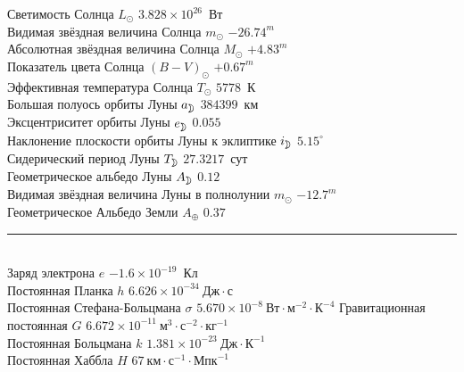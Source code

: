 \noindent Светимость Солнца $L_\odot$ \hfill $3.828 \times 10^{26}$~Вт\\
Видимая звёздная величина Солнца $m_\odot$ \hfill $-26.74^m$\\
Абсолютная звёздная величина Солнца $M_\odot$ \hfill $+4.83^m$\\
Показатель цвета Солнца $(B - V)_\odot$ \hfill $+0.67^m$\\
Эффективная температура Солнца $T_\odot$ \hfill $5778$~К\\
Большая полуось орбиты Луны $a_{\moon}$ \hfill $384399$~км\\
Эксцентриситет орбиты Луны $e_{\moon}$ \hfill $0.055$\\
Наклонение плоскости орбиты Луны к эклиптике $i_{\moon}$ \hfill $5.15^\circ$\\
Сидерический период Луны $T_{\moon}$ \hfill $27.3217$~сут\\
Геометрическое альбедо Луны $A_{\moon}$ \hfill $0.12$\\
Видимая звёздная величина Луны в полнолунии $m_{\odot}$ \hfill $-12.7^m$\\
Геометрическое Альбедо Земли $A_\oplus$ \hfill $0.37$\\[-5pt]
\rule{\tw}{.7pt}\\
Заряд электрона $e$ \hfill $-1.6 \times 10^{-19}$~Кл\\
Постоянная Планка $h$ \hfill $6.626 \times 10^{-34}~\text{Дж}\cdot\text{с}$\\
Постоянная Стефана-Больцмана $\sigma$ \hfill $5.670 \times 10^{-8}~\text{Вт} \cdot \text{м}^{-2} \cdot \text{К}^{-4}$
Гравитационная постоянная $G$ \hfill $6.672 \times 10^{-11}~\text{м}^3 \cdot \text{с}^{-2} \cdot \text{кг}^{-1}$\\
Постоянная Больцмана $k$ \hfill $1.381 \times 10^{-23}~\text{Дж} \cdot \text{К}^{-1}$\\
Постоянная Хаббла $H$ \hfill $67~\text{км} \cdot \text{с}^{-1} \cdot \text{Мпк}^{-1}$

